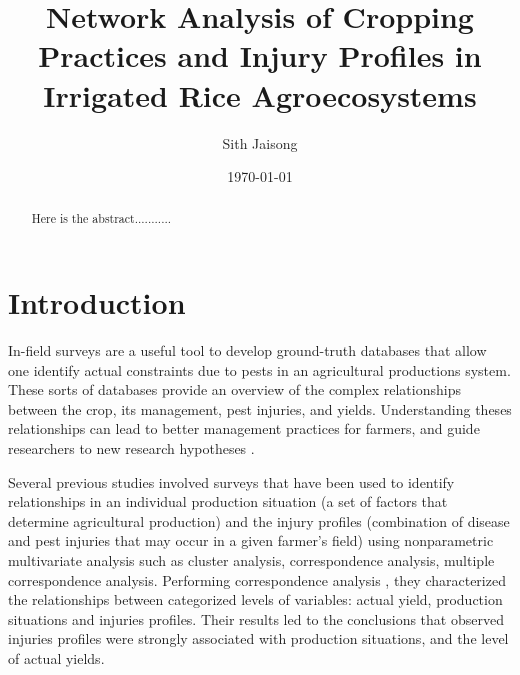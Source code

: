 \documentclass[a4paper]{article}
\title{Network Analysis of Cropping Practices and Injury Profiles in Irrigated Rice Agroecosystems}
\author{Sith Jaisong}
\date{\today}
\begin{document}
\maketitle

\begin{abstract}
Here is the abstract...........
\end{abstract}

\section*{Introduction}

In-field surveys are a useful tool to develop ground-truth databases that allow one identify actual constraints due to pests in an agricultural productions system. These sorts of databases provide an overview of the complex relationships between the crop, its management, pest injuries, and yields. Understanding theses relationships can lead to better management practices for farmers, and guide researchers to new research hypotheses \citep{mew:2004kh, Savary:2006to}.


Several previous studies \citep{Savary:2000char, savary2000quanti, savary2005multiple, dong2010characterization, Reddy:2011hl} involved surveys that have been used to identify relationships in an individual production situation (a set of factors that determine agricultural production) and the injury profiles (combination of disease and pest injuries that may occur in a given farmer's field) using nonparametric multivariate analysis such as cluster analysis, correspondence analysis, multiple correspondence analysis. Performing correspondence analysis \citep{savary1997new}, they characterized the relationships between categorized levels of variables: actual yield, production situations and injuries profiles. Their results led to the conclusions that observed injuries profiles were strongly associated with production situations, and the level of actual yields.
\end{document}
